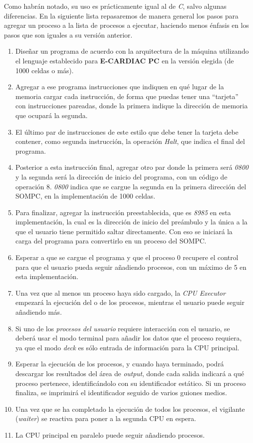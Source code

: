 \documentclass[letterpaper,12pt,oneside]{book}
\begin{document}
			Como habrán notado, su uso es prácticamente igual al de \textit{C},
			salvo algunas diferencias. En la siguiente lista repasaremos de manera general
			los pasos para agregar un proceso a la lista de procesos a ejecutar, haciendo menos énfasis en los pasos que son iguales a su versión anterior.			
			\begin{enumerate}

				\item Diseñar un programa de acuerdo con la arquitectura de la máquina utilizando el lenguaje establecido para \textbf{E-CARDIAC PC} en
				la versión elegida (de 1000 celdas o más).
				\item Agregar a ese programa instrucciones que indiquen en qué lugar de la memoria cargar cada instrucción, de forma que puedas tener
				una ``tarjeta'' con instrucciones pareadas, donde la primera indique la dirección de memoria que ocupará la segunda.
				\item El último par de instrucciones de este estilo que debe tener la tarjeta debe contener, como segunda instrucción,
				la operación \textit{Halt}, que indica el final del programa.
				\item Posterior a esta instrucción final, agregar otro par donde la primera será \textit{0800} y la segunda será la dirección de inicio 
				del
				programa, con un código de operación 8. \textit{0800} indica que se cargue la segunda en la primera dirección del SOMPC, en
				la implementación de 1000 celdas.
				\item Para finalizar, agregar la instrucción preestablecida, que es 
				\textit{8985} en esta implementación, la cual es la dirección de inicio del 
				preámbulo y
				la única a la que el usuario tiene permitido saltar directamente. Con eso se iniciará la carga del programa para convertirlo en
				un proceso del SOMPC.
				\item Esperar a que se cargue el programa y que el proceso 0 recupere el control para que el usuario pueda
				seguir añadiendo procesos, con 
				un
				máximo de 5 en esta implementación.
				\item Una vez que al menos un proceso haya sido cargado, la \textit{CPU Executor} empezará la ejecución del o de los procesos,
				mientras el usuario puede seguir añadiendo más.
				\item Si uno de los \textit{procesos del usuario} requiere interacción con el usuario, se deberá usar el modo terminal para añadir los
				datos que el proceso requiera, ya que  el modo \textit{deck} es sólo entrada de información para la CPU principal.
				\item Esperar la ejecución de los procesos, y cuando haya terminado, podrá descargar los resultados del área de \textit{output}, 
				donde cada salida indicará a qué proceso pertenece, identificándolo con su identificador estático.
				Si un proceso finaliza, se imprimirá el identificador
				seguido de varios guiones medios.
				\item Una vez que se ha completado la ejecución de todos los procesos, el vigilante (\textit{waiter})
				 se reactiva para poner a la segunda CPU en espera.
				\item La CPU principal en paralelo puede seguir añadiendo procesos.
				

\end{enumerate}
\end{document}
